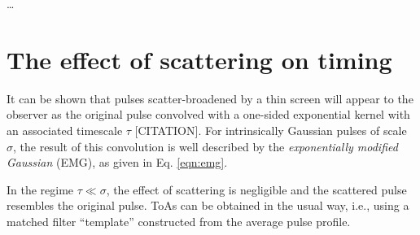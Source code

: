 \documentclass[fleqn,usenatbib]{mnras}
\begin{document}
\dots
 











\appendix

\section{The effect of scattering on timing}
\label{app:scattering_dm}

It can be shown that pulses scatter-broadened by a thin screen will appear to the observer as the original pulse convolved with a one-sided exponential kernel with an associated timescale $\tau$ [CITATION].
For intrinsically Gaussian pulses of scale $\sigma$, the result of this convolution is well described by the \textit{exponentially modified Gaussian} (EMG), as given in Eq. \eqref{eqn:emg}.

In the regime $\tau \ll \sigma$, the effect of scattering is negligible and the scattered pulse resembles the original pulse.
ToAs can be obtained in the usual way, i.e., using a matched filter ``template'' constructed from the average pulse profile.
\end{document}
